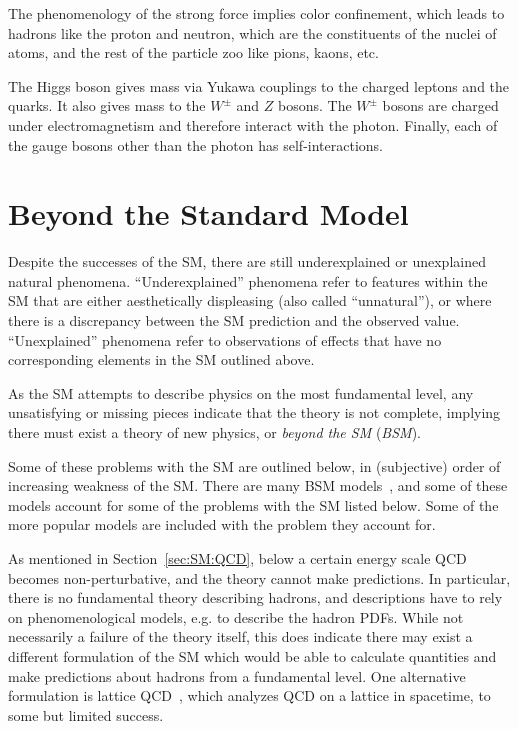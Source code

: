 The phenomenology of the strong force implies color confinement, which leads to hadrons like the proton and neutron, which are the constituents of the nuclei of atoms, and the rest of the particle zoo like pions, kaons, etc.

The Higgs boson gives mass via Yukawa couplings to the charged leptons and the quarks.
It also gives mass to the $W^\pm$ and $Z$ bosons.
The $W^\pm$ bosons are charged under electromagnetism and therefore interact with the photon.
Finally, each of the gauge bosons other than the photon has self-interactions.

\section{Beyond the Standard Model}
\label{sec:SM:BSM}
Despite the successes of the SM, there are still underexplained or unexplained natural phenomena.
``Underexplained'' phenomena refer to features within the SM that are either aesthetically displeasing (also called ``unnatural''), or where there is a discrepancy between the SM prediction and the observed value.
``Unexplained'' phenomena refer to observations of effects that have no corresponding elements in the SM outlined above.

As the SM attempts to describe physics on the most fundamental level, any unsatisfying or missing pieces indicate that the theory is not complete, implying there must exist a theory of new physics, or \textit{beyond the SM} (\textit{BSM}).

Some of these problems with the SM are outlined below, in (subjective) order of increasing weakness of the SM.
There are many BSM models~\cite{Lykken:2010mc,Lee:2019zbu,Ellis:2009pz,Ellis:2012zz,Virdee:2016,Halkiadakis:2014qda}, and some of these models account for some of the problems with the SM listed below.
Some of the more popular models are included with the problem they account for.

As mentioned in Section~\ref{sec:SM:QCD}, below a certain energy scale QCD becomes non-perturbative, and the theory cannot make predictions.
In particular, there is no fundamental theory describing hadrons, and descriptions have to rely on phenomenological models, e.g. to describe the hadron PDFs.
While not necessarily a failure of the theory itself, this does indicate there may exist a different formulation of the SM which would be able to calculate quantities and make predictions about hadrons from a fundamental level.
One alternative formulation is lattice QCD~\cite{Gupta:1997nd}, which analyzes QCD on a lattice in spacetime, to some but limited success.

